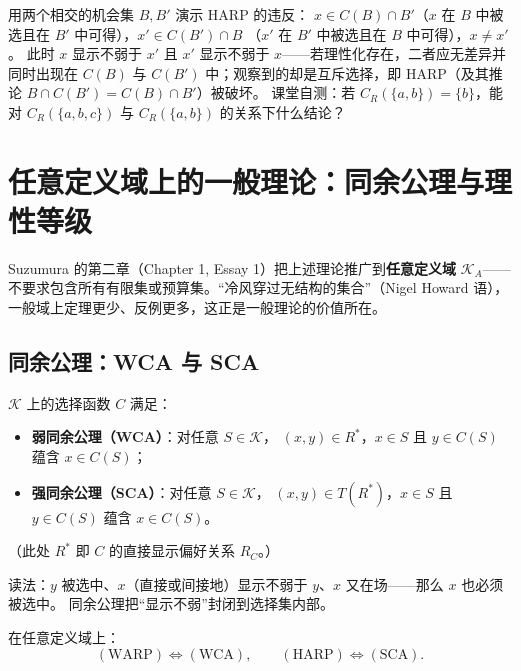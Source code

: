 \begin{remark}
用两个相交的机会集 $B, B'$ 演示 HARP 的违反：
$x\in C(B)\cap B'$（$x$ 在 $B$ 中被选且在 $B'$ 中可得），$x'\in C(B')\cap B$
（$x'$ 在 $B'$ 中被选且在 $B$ 中可得），$x\neq x'$。
此时 $x$ 显示不弱于 $x'$ 且 $x'$ 显示不弱于 $x$——若理性化存在，二者应无差异并同时出现在
$C(B)$ 与 $C(B')$ 中；观察到的却是互斥选择，即 HARP（及其推论 $B\cap C(B')=C(B)\cap B'$）被破坏。
课堂自测：若 $C_R(\{a,b\})=\{b\}$，能对 $C_R(\{a,b,c\})$ 与 $C_R(\{a,b\})$ 的关系下什么结论？
\end{remark}

\section{任意定义域上的一般理论：同余公理与理性等级}

Suzumura 的第二章（Chapter 1, Essay 1）把上述理论推广到\textbf{任意定义域}
$\mathcal{K}_A$——不要求包含所有有限集或预算集。“冷风穿过无结构的集合”（Nigel Howard 语），
一般域上定理更少、反例更多，这正是一般理论的价值所在。

\subsection{同余公理：WCA 与 SCA}

\begin{definition}\label{def:congruence}
$\mathcal{K}$ 上的选择函数 $C$ 满足：
\begin{itemize}
  \item[(a)] \textbf{弱同余公理（WCA）}：对任意 $S\in\mathcal{K}$，
  $(x,y)\in R^*$，$x\in S$ 且 $y\in C(S)$ 蕴含 $x\in C(S)$；
  \item[(b)] \textbf{强同余公理（SCA）}：对任意 $S\in\mathcal{K}$，
  $(x,y)\in T(R^*)$，$x\in S$ 且 $y\in C(S)$ 蕴含 $x\in C(S)$。
\end{itemize}
（此处 $R^*$ 即 $C$ 的直接显示偏好关系 $R_C$。）
\end{definition}

读法：$y$ 被选中、$x$（直接或间接地）显示不弱于 $y$、$x$ 又在场——那么 $x$ 也必须被选中。
同余公理把“显示不弱”封闭到选择集内部。

\begin{theorem}[公理等价]\label{thm:equiv}
在任意定义域上：
\[
(\mathrm{WARP}) \iff (\mathrm{WCA}), \qquad (\mathrm{HARP}) \iff (\mathrm{SCA}).
\]
\end{theorem}

